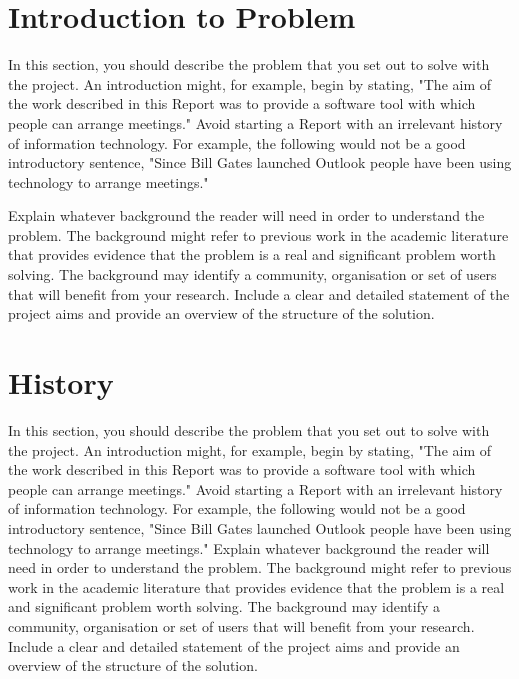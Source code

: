 \section{Introduction to Problem}
In this section, you should describe the problem that you set out to solve with the project. An introduction might, for example, begin by stating, "The aim of the work described in this Report was to provide a software tool with which people can arrange meetings." Avoid starting a Report with an irrelevant history of information technology. For example, the following would not be a good introductory sentence, "Since Bill Gates launched Outlook people have been using technology to arrange meetings."

Explain whatever background the reader will need in order to understand the problem. The background might refer to previous work in the academic literature that provides evidence that the problem is a real and significant problem worth solving. The background may identify a community, organisation or set of users that will benefit from your research. Include a clear and detailed statement of the project aims and provide an overview of the structure of the solution.

\section{History}
In this section, you should describe the problem that you set out to solve with the project. An introduction might, for example, begin by stating, "The aim of the work described in this Report was to provide a software tool with which people can arrange meetings." Avoid starting a Report with an irrelevant history of information technology. For example, the following would not be a good introductory sentence, "Since Bill Gates launched Outlook people have been using technology to arrange meetings."
Explain whatever background the reader will need in order to understand the problem. The background might refer to previous work in the academic literature that provides evidence that the problem is a real and significant problem worth solving. The background may identify a community, organisation or set of users that will benefit from your research. Include a clear and detailed statement of the project aims and provide an overview of the structure of the solution.

